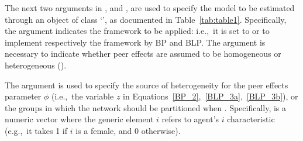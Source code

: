 \documentclass[nojss]{jss}
\begin{document}
The next two arguments in ,  and
, are used to specify the model to be estimated through an
object of class `', as documented in Table~\ref{tab:table1}. 
Specifically, the argument  indicates the framework to be
applied: i.e.,~it is set to  or  to implement
respectively the framework by BP and BLP.  The argument 
is necessary to indicate whether peer effects are assumed to be homogeneous
 or heterogeneous ().
%
\begin{table}[t!]
\centering
{}
\caption{\label{tab:table1} Field specification in .}
\end{table}
%

The argument  is used to specify the source of heterogeneity for the
peer effects parameter $\phi$ (i.e.,~the variable $z$ in
Equations~\ref{BP_2},~\ref{BLP_3a},~\ref{BLP_3b}), or the groups in which the
network should be partitioned when .  Specifically,
 is a numeric vector where the generic element $i$ refers to agent's
$i$ characteristic (e.g.,~it takes 1 if $i$ is a female, and 0 otherwise).
\end{document}
